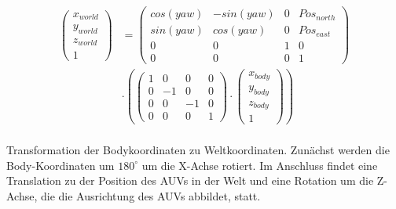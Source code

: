\begin{ownequation}[H]
\begin{equation}
\begin{split}
\begin{pmatrix}
x_{world} \\ y_{world} \\ z_{world} \\ 1
\end{pmatrix}
& =
\begin{pmatrix}
cos(yaw) & -sin(yaw) & 0 & Pos_{north}\\
sin(yaw) & cos(yaw) & 0 & Pos_{east}\\
0 & 0 & 1 & 0\\
0 & 0 & 0 & 1
\end{pmatrix}\\
&\cdot
\left(
\begin{pmatrix}
1 & 0 & 0& 0\\
0 & -1 & 0& 0\\
0 & 0 & -1& 0\\
0 & 0 & 0 & 1
\end{pmatrix}
\cdot
\begin{pmatrix}
x_{body} \\ y_{body} \\ z_{body} \\ 1
\end{pmatrix}
\right)\\
\end{split}
\end{equation}
\caption[Transformation der Bodykoordinaten zu Weltkoordinaten]{Transformation der Bodykoordinaten zu Weltkoordinaten. Zunächst werden die Body-Koordinaten um $180^\circ$ um die X-Achse rotiert. Im Anschluss findet eine Translation zu der Position des AUVs in der Welt und eine Rotation um die Z-Achse, die die Ausrichtung des AUVs abbildet, statt.}
\label{trans_body_world}
\end{ownequation}

